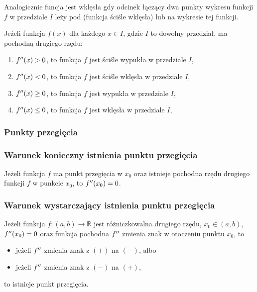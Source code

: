 \documentclass[../Matematyka.tex]{subfiles}
\begin{document}
    Analogicznie funcja jest wklęsła gdy odcinek łączący dwa punkty wykresu funkcji \(f\) w przedziale \(I\) leży pod (funkcja ściśle wklęsła) lub na wykresie tej funkcji.

    Jeżeli funkcja \(f(x)\) dla każdego \(x \in I\), gdzie \(I\) to dowolny przedział, ma pochodną drugiego rzędu:
    \begin{enumerate}
        \item \(f^{\prime\prime}(x) > 0\), to funkcja \(f\) jest ściśle wypukła w przedziale \(I\),
        \item \(f^{\prime\prime}(x) < 0\), to funkcja \(f\) jest ściśle wklęsła w przedziale \(I\),
        \item \(f^{\prime\prime}(x) \geq 0\), to funkcja \(f\) jest wypukła w przedziale \(I\),
        \item \(f^{\prime\prime}(x) \leq 0\), to funkcja \(f\) jest wklęsła w przedziale \(I\),
    \end{enumerate}

    \subsubsection{Punkty przegięcia}
    \subsubsection*{Warunek konieczny istnienia punktu przegięcia}
    Jeżeli funkcja \(f\) ma punkt przegięcia w \(x_0\) oraz istnieje pochodna rzędu drugiego funkcji \(f\) w punkcie \(x_0\), to \(f^{\prime\prime}(x_0) = 0\).
    \subsubsection*{Warunek wystarczający istnienia punktu przegięcia}
    Jeżeli funkcja \(f:(a, b) \rightarrow \mathbb{R}\) jest różniczkowalna drugiego rzędu, \(x_0 \in (a,b)\), \(f^{\prime\prime}(x_0) = 0\) oraz funkcja pochodna \(f^{\prime\prime}\) zmienia znak w otoczeniu punktu \(x_0\), to
    \begin{itemize}
        \item jeżeli \(f^{\prime\prime}\) zmienia znak z \((+)\) na \((-)\), albo
        \item jeżeli \(f^{\prime\prime}\) zmienia znak z \((-)\) na \((+)\),
    \end{itemize}
    to istnieje punkt przegięcia.
\end{document}
